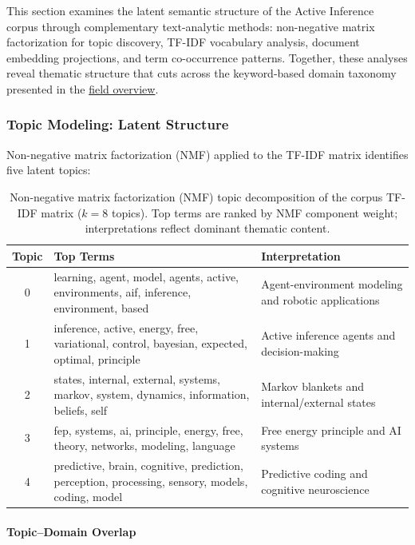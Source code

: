 \documentclass[
  english,
]{article}
\begin{document}
{{{{{{{{{{{{{{{{This section examines the latent semantic structure of the Active
Inference corpus through complementary text-analytic methods:
non-negative matrix factorization for topic discovery, TF-IDF vocabulary
analysis, document embedding projections, and term co-occurrence
patterns. Together, these analyses reveal thematic structure that cuts
across the keyword-based domain taxonomy presented in the
\hyperref[sec:field_overview]{field overview}.

\subsubsection{Topic Modeling: Latent
Structure}\label{topic-modeling-latent-structure}

Non-negative matrix factorization (NMF) applied to the TF-IDF matrix
identifies five latent topics:

\begin{table}[htbp]
\centering
\caption{Non-negative matrix factorization (NMF) topic decomposition of the corpus TF-IDF matrix ($k = 8$ topics). Top terms are ranked by NMF component weight; interpretations reflect dominant thematic content.}
\label{tab:nmf_topics}
\begin{tabular}{clp{6cm}}
\toprule
\textbf{Topic} & \textbf{Top Terms} & \textbf{Interpretation} \\
\midrule
0 & learning, agent, model, agents, active, environments, aif, inference, environment, based & Agent-environment modeling and robotic applications \\
1 & inference, active, energy, free, variational, control, bayesian, expected, optimal, principle & Active inference agents and decision-making \\
2 & states, internal, external, systems, markov, system, dynamics, information, beliefs, self & Markov blankets and internal/external states \\
3 & fep, systems, ai, principle, energy, free, theory, networks, modeling, language & Free energy principle and AI systems \\
4 & predictive, brain, cognitive, prediction, perception, processing, sensory, models, coding, model & Predictive coding and cognitive neuroscience \\
\bottomrule
\end{tabular}
\end{table}

\paragraph{Topic--Domain Overlap}\label{topicdomain-overlap}

}}}}}}}}}}}}}}}}
\end{document}
